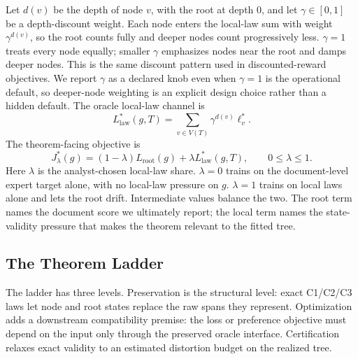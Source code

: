 Let \(d(v)\) be the depth of node \(v\), with the root at depth \(0\),
and let \(\gamma\in[0,1]\) be a depth-discount weight. Each node enters
the local-law sum with weight \(\gamma^{d(v)}\), so the root counts
fully and deeper nodes count progressively less. \(\gamma=1\) treats
every node equally; smaller \(\gamma\) emphasizes nodes near the root
and damps deeper nodes. This is the same discount pattern used in
discounted-reward objectives. We report \(\gamma\) as a declared knob
even when \(\gamma=1\) is the operational default, so deeper-node
weighting is an explicit design choice rather than a hidden default.
The oracle local-law channel is
\begin{equation}
\label{eq:v8-local-law-estimand}
  L_{\mathrm{law}}^\ast(g,T)
  =
  \sum_{v\in V(T)}\gamma^{d(v)}\ell_v^\ast .
\end{equation}
The theorem-facing objective is
\begin{equation}
\label{eq:v8-main-objective}
  J_\lambda^\ast(g)
  =
  (1-\lambda)L_{\mathrm{root}}(g)
  +
  \lambda L_{\mathrm{law}}^\ast(g,T),
  \qquad 0\le\lambda\le 1 .
\end{equation}
Here \(\lambda\) is the analyst-chosen local-law share. \(\lambda=0\)
trains on the document-level expert target alone, with no local-law
pressure on \(g\). \(\lambda=1\) trains on local laws alone and lets
the root drift. Intermediate values balance the two. The root term
names the document score we ultimately report; the local term names
the state-validity pressure that makes the theorem relevant to the
fitted tree.

\subsection{The Theorem Ladder}

The ladder has three levels. Preservation is the structural level:
exact C1/C2/C3 laws let node and root states replace the raw spans
they represent. Optimization adds a downstream compatibility
premise: the loss or preference objective must depend on the input
only through the preserved oracle interface. Certification relaxes
exact validity to an estimated distortion budget on the realized
tree.

